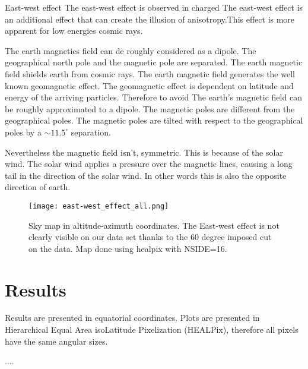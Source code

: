 \documentclass{PoS}
\begin{document}
East-west effect
The east-west effect is observed in charged
The east-west effect is an additional effect that can create the  illusion of anisotropy.This effect is more apparent for low energies cosmic rays.

The earth magnetics field  can de roughly considered as a dipole. The geographical  north pole and the  magnetic pole are separated. The earth magnetic  field  shields earth from cosmic rays. The earth magnetic field generates the well known geomagnetic effect. The  geomagnetic effect is dependent on latitude and energy of the arriving particles.  Therefore to avoid
The earth's magnetic field can be roughly approximated to a dipole. The magnetic poles are different from the geographical poles. The magnetic poles are  tilted with respect to the  geographical poles by a $\sim 11.5 ^{\circ}$ separation.

Nevertheless the magnetic field isn't, symmetric.  This is  because of the solar wind. The solar wind applies a pressure over the magnetic lines, causing a long tail in the direction of the solar wind. In other words this is also the opposite direction of earth.
\begin{figure}[!ht]\label{allCR_east_west_effect}

\texttt{[image: east-west\_effect\_all.png]}
\caption{Sky map in altitude-azimuth coordinates. The East-west effect is not clearly visible on our  data set thanks to the  60 degree  imposed  cut on the data. Map done using healpix with NSIDE=16.  }

\end{figure}

\section{Results}

Results are presented in equatorial coordinates.
Plots are presented in Hierarchical Equal Area isoLatitude Pixelization (HEALPix), therefore all pixels have the same angular sizes.











\begin{thebibliography}{99}
....

\end{thebibliography}
\end{document}

